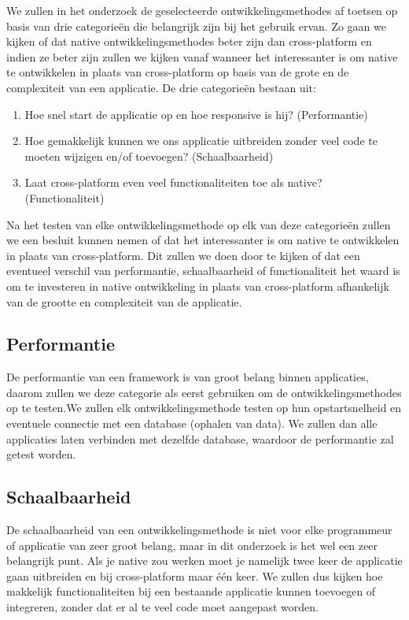 We zullen in het onderzoek de geselecteerde ontwikkelingsmethodes af toetsen op basis van drie 
categorieën die belangrijk zijn bij het gebruik ervan. Zo gaan we kijken of dat native 
ontwikkelingsmethodes beter zijn dan cross-platform en indien ze beter zijn zullen we kijken vanaf 
wanneer het interessanter is om native te ontwikkelen in plaats van cross-platform op basis van 
de grote en de complexiteit van een applicatie. De drie categorieën bestaan uit:
\begin{enumerate}
  \item Hoe snel start de applicatie op en hoe responsive is hij? (Performantie)
  \item Hoe gemakkelijk kunnen we ons applicatie uitbreiden zonder veel code te moeten wijzigen en/of toevoegen? (Schaalbaarheid)
  \item Laat cross-platform even veel functionaliteiten toe als native? (Functionaliteit)
\end{enumerate}
Na het testen van elke ontwikkelingsmethode op elk van deze categorieën zullen we een besluit 
kunnen nemen of dat het interessanter is om native te ontwikkelen in plaats van cross-platform. 
Dit zullen we doen door te kijken of dat een eventueel verschil van performantie, schaalbaarheid 
of functionaliteit het waard is om te investeren in native ontwikkeling in plaats van 
cross-platform afhankelijk van de grootte en complexiteit van de applicatie.

\subsection{Performantie}
De performantie van een framework is van groot belang binnen applicaties, daarom zullen 
we deze categorie als eerst gebruiken om de ontwikkelingsmethodes op te testen.We zullen 
elk ontwikkelingsmethode testen op hun opstartsnelheid en eventuele connectie met een 
database (ophalen van data). We zullen dan alle applicaties laten verbinden met dezelfde 
database, waardoor de performantie zal getest worden.

\subsection{Schaalbaarheid}
De schaalbaarheid van een ontwikkelingsmethode is niet voor elke programmeur of applicatie 
van zeer groot belang, maar in dit onderzoek is het wel een zeer belangrijk punt. Als je 
native zou werken moet je namelijk twee keer de applicatie gaan uitbreiden en bij cross-platform 
maar één keer. We zullen dus kijken hoe makkelijk functionaliteiten bij een bestaande applicatie 
kunnen toevoegen of integreren, zonder dat er al te veel code moet aangepast worden.

